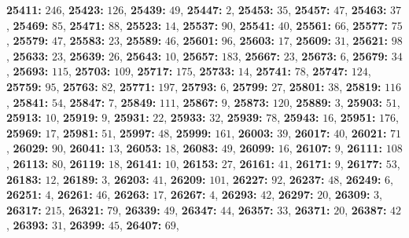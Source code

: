\textsf{\bfseries 25411:} $246$, \textsf{\bfseries 25423:} $126$, \textsf{\bfseries 25439:} $49$, \textsf{\bfseries 25447:} $2$, \textsf{\bfseries 25453:} $35$, \textsf{\bfseries 25457:} $47$, \textsf{\bfseries 25463:} $37$, \textsf{\bfseries 25469:} $85$, \textsf{\bfseries 25471:} $88$, \textsf{\bfseries 25523:} $14$, \textsf{\bfseries 25537:} $90$, \textsf{\bfseries 25541:} $40$, \textsf{\bfseries 25561:} $66$, \textsf{\bfseries 25577:} $75$, \textsf{\bfseries 25579:} $47$, \textsf{\bfseries 25583:} $23$, \textsf{\bfseries 25589:} $46$, \textsf{\bfseries 25601:} $96$, \textsf{\bfseries 25603:} $17$, \textsf{\bfseries 25609:} $31$, \textsf{\bfseries 25621:} $98$, \textsf{\bfseries 25633:} $23$, \textsf{\bfseries 25639:} $26$, \textsf{\bfseries 25643:} $10$, \textsf{\bfseries 25657:} $183$, \textsf{\bfseries 25667:} $23$, \textsf{\bfseries 25673:} $6$, \textsf{\bfseries 25679:} $34$, \textsf{\bfseries 25693:} $115$, \textsf{\bfseries 25703:} $109$, \textsf{\bfseries 25717:} $175$, \textsf{\bfseries 25733:} $14$, \textsf{\bfseries 25741:} $78$, \textsf{\bfseries 25747:} $124$, \textsf{\bfseries 25759:} $95$, \textsf{\bfseries 25763:} $82$, \textsf{\bfseries 25771:} $197$, \textsf{\bfseries 25793:} $6$, \textsf{\bfseries 25799:} $27$, \textsf{\bfseries 25801:} $38$, \textsf{\bfseries 25819:} $116$, \textsf{\bfseries 25841:} $54$, \textsf{\bfseries 25847:} $7$, \textsf{\bfseries 25849:} $111$, \textsf{\bfseries 25867:} $9$, \textsf{\bfseries 25873:} $120$, \textsf{\bfseries 25889:} $3$, \textsf{\bfseries 25903:} $51$, \textsf{\bfseries 25913:} $10$, \textsf{\bfseries 25919:} $9$, \textsf{\bfseries 25931:} $22$, \textsf{\bfseries 25933:} $32$, \textsf{\bfseries 25939:} $78$, \textsf{\bfseries 25943:} $16$, \textsf{\bfseries 25951:} $176$, \textsf{\bfseries 25969:} $17$, \textsf{\bfseries 25981:} $51$, \textsf{\bfseries 25997:} $48$, \textsf{\bfseries 25999:} $161$, \textsf{\bfseries 26003:} $39$, \textsf{\bfseries 26017:} $40$, \textsf{\bfseries 26021:} $71$, \textsf{\bfseries 26029:} $90$, \textsf{\bfseries 26041:} $13$, \textsf{\bfseries 26053:} $18$, \textsf{\bfseries 26083:} $49$, \textsf{\bfseries 26099:} $16$, \textsf{\bfseries 26107:} $9$, \textsf{\bfseries 26111:} $108$, \textsf{\bfseries 26113:} $80$, \textsf{\bfseries 26119:} $18$, \textsf{\bfseries 26141:} $10$, \textsf{\bfseries 26153:} $27$, \textsf{\bfseries 26161:} $41$, \textsf{\bfseries 26171:} $9$, \textsf{\bfseries 26177:} $53$, \textsf{\bfseries 26183:} $12$, \textsf{\bfseries 26189:} $3$, \textsf{\bfseries 26203:} $41$, \textsf{\bfseries 26209:} $101$, \textsf{\bfseries 26227:} $92$, \textsf{\bfseries 26237:} $48$, \textsf{\bfseries 26249:} $6$, \textsf{\bfseries 26251:} $4$, \textsf{\bfseries 26261:} $46$, \textsf{\bfseries 26263:} $17$, \textsf{\bfseries 26267:} $4$, \textsf{\bfseries 26293:} $42$, \textsf{\bfseries 26297:} $20$, \textsf{\bfseries 26309:} $3$, \textsf{\bfseries 26317:} $215$, \textsf{\bfseries 26321:} $79$, \textsf{\bfseries 26339:} $49$, \textsf{\bfseries 26347:} $44$, \textsf{\bfseries 26357:} $33$, \textsf{\bfseries 26371:} $20$, \textsf{\bfseries 26387:} $42$, \textsf{\bfseries 26393:} $31$, \textsf{\bfseries 26399:} $45$, \textsf{\bfseries 26407:} $69$, 
